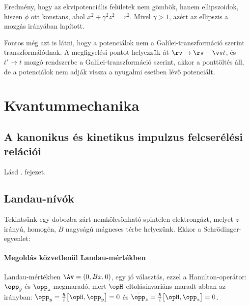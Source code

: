    Eredmény, hogy az ekvipotenciális felületek nem gömbök, hanem ellipszoidok, hiszen $\phi$ ott konstans, ahol $x^2+\gamma^2z^2=r^2$.
   Mivel $\gamma>1$, azért az ellipszis a mozgás irányában lapított. 
   
   Fontos még azt is látni, hogy a potenciálok nem a Galilei-transzformáció szerint transzformálódnak.
   A megfigyelési pontot helyezzük át $\rv\to\rv+\vv t$, és $t'\to t$ mozgó rendszerbe a Galilei-transzformáció szerint, akkor a ponttöltés áll, de a potenciálok nem adják vissza a nyugalmi esetben lévő potenciált.

 \section{Kvantummechanika}
  
  \subsection{A kanonikus és kinetikus impulzus felcserélési relációi}
   
   Lásd . fejezet.
   
  \subsection{Landau-nívók}
   
   Tekintsünk egy dobozba zárt nemkölcsönható spintelen elektrongázt, melyet $z$ irányú, homogén, $B$ nagyságú mágneses térbe helyezünk.
   Ekkor a Schrödinger-egyenlet:
   \paragraph{Megoldás közvetlenül Landau-mértékben}
    
    Landau-mértékben $\Av=(0,Bx,0)$, egy jó választás, ezzel a Hamilton-operátor:
    $\opp_y$ és $\opp_z$ megmaradó, mert $\opH$ eltolásinvariáns maradt abban az irányban: $\dot\opp_y=\frac{\hbar}{i}\big[\opH,\opp_y\big]=0$ és $\dot\opp_z=\frac{\hbar}{i}\big[\opH,\opp_z\big]=0$.
    
